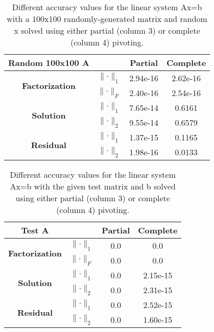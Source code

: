 \documentclass[11pt]{article}
\newcommand{\norm}[1]{\lVert#1\rVert}
\begin{document}
\begin{table}[h]
	\centering
	\begin{tabular}{|c|c|c|c|}
	\hline
	\textbf{Random 100x100 A}               &                  	& \textbf{Partial} & \textbf{Complete} \\ \hline
	\multirow{2}{*}{\textbf{Factorization}} 		& $\norm{\cdot}_1$ & 2.94e-16         & 2.62e-16          \\ \cline{2-4} 
				  	                                          	& $\norm{\cdot}_F$ & 2.40e-16         & 2.54e-16          \\ \hline
	\multirow{2}{*}{\textbf{Solution}}      			& $\norm{\cdot}_1$ & 7.65e-14         & 0.6161            \\ \cline{2-4} 
	                                        					& $\norm{\cdot}_2$ & 9.55e-14         & 0.6579            \\ \hline
	\multirow{2}{*}{\textbf{Residual}}      			& $\norm{\cdot}_1$ & 1.37e-15         & 0.1165            \\ \cline{2-4} 
	                                        					& $\norm{\cdot}_2$ & 1.98e-16         & 0.0133            \\ \hline
	\end{tabular}
	\caption{Different accuracy values for the linear system Ax=b with a 100x100 randomly-generated matrix and random x solved using either partial (column 3) or complete (column 4) pivoting.}
	\label{tab:rand100}
\end{table}

\begin{table}[h]
	\centering
	\begin{tabular}{|c|c|c|c|}
	\hline
	\textbf{Test A}                         &                  			& \textbf{Partial} & \textbf{Complete} \\ \hline
	\multirow{2}{*}{\textbf{Factorization}} 	& $\norm{\cdot}_1$ & 0.0              & 0.0               \\ \cline{2-4} 
	                                        				& $\norm{\cdot}_F$ & 0.0              & 0.0               \\ \hline
	\multirow{2}{*}{\textbf{Solution}}      		& $\norm{\cdot}_1$ & 0.0              & 2.15e-15          \\ \cline{2-4} 
	                                        				& $\norm{\cdot}_2$ & 0.0              & 2.31e-15          \\ \hline
	\multirow{2}{*}{\textbf{Residual}}      		& $\norm{\cdot}_1$ & 0.0              & 2.52e-15          \\ \cline{2-4} 
	                                        				& $\norm{\cdot}_2$ & 0.0              & 1.60e-15          \\ \hline
	\end{tabular}
	\caption{Different accuracy values for the linear system Ax=b with the given test matrix and b solved using either partial (column 3) or complete (column 4) pivoting.}
	\label{tab:test}
\end{table}
\end{document}
